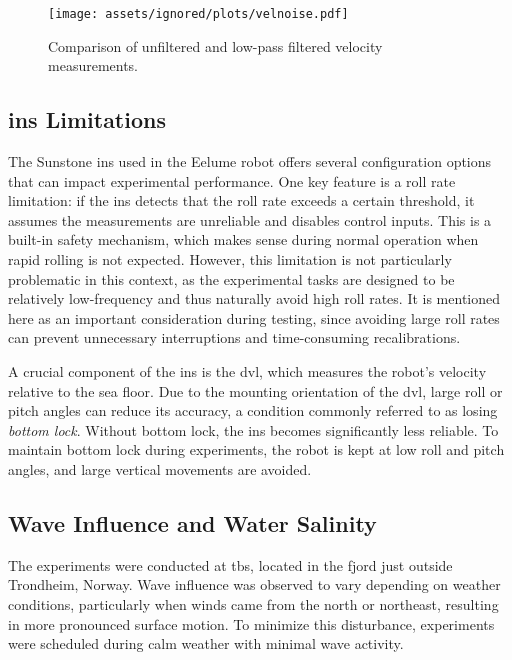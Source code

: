 \begin{figure}[h!]
    \centering
    \texttt{[image: assets/ignored/plots/velnoise.pdf]}
    \caption{Comparison of unfiltered and low-pass filtered velocity measurements.}
    \label{fig:eelume:velocity-noise-low-pass-comp}
\end{figure}

\subsection*{\gls{ins} Limitations}
The Sunstone \gls{ins} used in the Eelume robot offers several configuration options that can impact experimental performance. One key feature is a roll rate limitation: if the \gls{ins} detects that the roll rate exceeds a certain threshold, it assumes the measurements are unreliable and disables control inputs. This is a built-in safety mechanism, which makes sense during normal operation when rapid rolling is not expected. However, this limitation is not particularly problematic in this context, as the experimental tasks are designed to be relatively low-frequency and thus naturally avoid high roll rates. It is mentioned here as an important consideration during testing, since avoiding large roll rates can prevent unnecessary interruptions and time-consuming recalibrations.

A crucial component of the \gls{ins} is the \gls{dvl}, which measures the robot’s velocity relative to the sea floor. Due to the mounting orientation of the \gls{dvl}, large roll or pitch angles can reduce its accuracy, a condition commonly referred to as losing \textit{bottom lock}. Without bottom lock, the \gls{ins} becomes significantly less reliable. To maintain bottom lock during experiments, the robot is kept at low roll and pitch angles, and large vertical movements are avoided.

\subsection*{Wave Influence and Water Salinity}
The experiments were conducted at \gls{tbs}, located in the fjord just outside 
Trondheim, Norway. Wave influence was observed to vary depending on weather 
conditions, particularly when winds came from the north or northeast, 
resulting in more pronounced surface motion. To minimize this disturbance, 
experiments were scheduled during calm weather with minimal wave activity.

